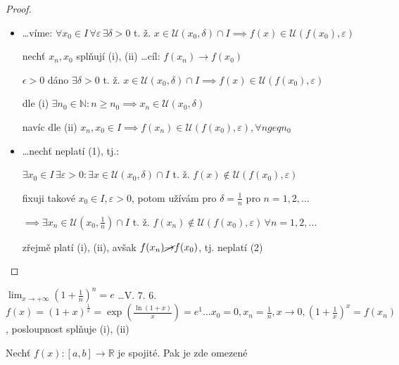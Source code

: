 \begin{proof}
  \begin{itemize}
    \item[(1) $\implies$ (2)] \dots víme: $\forall x_0 \in I \,\forall \varepsilon \, \exists \delta >0$ t. ž. $x\in \mathscr U(x_0, \delta) \cap I\implies f(x) \in \mathscr U (f(x_0), \varepsilon)$

    nechť $x_n, x_0$ splňují (i), (ii) \dots cíl: $f(x_n) \to f(x_0)$

    $\epsilon > 0$ dáno $\exists \delta > 0$ t. ž. $x\in \mathscr U(x_0, \delta) \cap I\implies f(x) \in \mathscr U (f(x_0), \varepsilon)$

    dle (i) $\exists n_0 \in \mathbb N: n \geq n_0 \implies x_n \in \mathscr U(x_0, \delta)$

    navíc dle (ii) $x_n, x_0 \in I \implies f(x_n) \in  \mathscr U(f(x_0), \varepsilon), \forall n geq n_0$
    \item[$\neg$(1) $\implies$ $\neg$(2)] \dots nechť neplatí (1), tj.:

    $\exists x_0 \in I \, \exists \varepsilon > 0: \exists x \in \mathscr U(x_0, \delta) \cap I$ t. ž. $f(x) \notin \mathscr U(f(x_0), \varepsilon)$

    fixuji takové $x_0 \in I, \varepsilon > 0$, potom užívám pro $\delta = \frac{1}{n}$ pro $n = 1, 2, \dots$

    $\implies \exists x_n \in \mathscr U(x_0, \frac{1}{n}) \cap I$ t. ž. $f(x_n) \notin \mathscr U(f(x_0), \varepsilon) \, \forall n = 1, 2, \dots$

    zřejmě platí (i), (ii), avšak $f(x_n) \cancel{\to} f(x_0)$, tj. neplatí (2)
  \end{itemize}
\end{proof}

\begin{priklad}
  $\lim_{x \to + \infty} \left(1+\frac{1}{n}\right)^n = e$ \dots V. 7. 6. $f(x) = (1+x)^{\frac{1}{x}} = \exp \left(\frac{\ln(1+x)}{x}\right)=e^1 \dots x_0 = 0, x_n = \frac{1}{n}, x \to 0, \left( 1+ \frac{1}{x} \right)^x = f(x_n)$, posloupnost splňuje (i), (ii)
\end{priklad}

\begin{veta}[6. 1.]
  Nechť $f(x): [a,b] \to \mathbb R$ je spojité. Pak je zde omezené
\end{veta}

